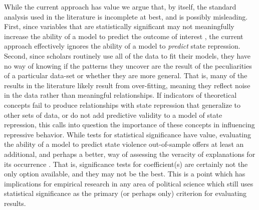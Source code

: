 \documentclass[11pt]{article}
\begin{document}
While the current approach has value we argue that, by itself, the standard analysis used in the literature is incomplete at best, and is possibly misleading. First, since variables that are statistically significant may not meaningfully increase the ability of a model to predict the outcome of interest \citep{Wardetal2010}, the current approach effectively ignores the ability of a model to {\em predict} state repression. Second, since scholars routinely use all of the data to fit their models, they have no way of knowing if the patterns they uncover are the result of the peculiarities of a particular data-set or whether they are more general. That is, many of the results in the literature likely result from over-fitting, meaning they reflect noise in the data rather than meaningful relationships. If indicators of theoretical concepts fail to produce relationships with state repression that generalize to other sets of data, or do not add predictive validity to a model of state repression, this calls into question the importance of these concepts in influencing repressive behavior. While tests for statistical significance have value, evaluating the ability of a model to predict state violence out-of-sample offers at least an additional, and perhaps a better, way of assessing the veracity of explanations for its occurrence \citep[See, e.g.][]{BeckKingZeng2000}. That is, significance tests for coefficient(s) are certainly not the only option available, and they may not be the best. This is a point which has implications for empirical research in any area of political science which still uses statistical significance as the primary (or perhaps only) criterion for evaluating results.
\end{document}
